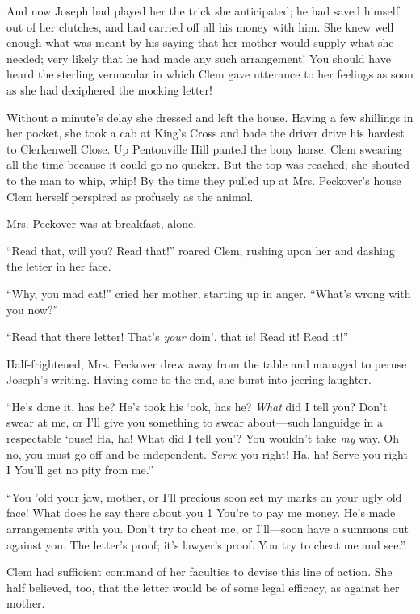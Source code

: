 And now Joseph had played her the trick she anticipated; he had saved
himself out of her clutches, and had carried off all his money with him.
She knew well enough what was meant by his saying that her mother would
supply what she needed; very likely that he had made any such
arrangement! You should have heard the sterling vernacular in which Clem
gave utterance to her feelings as soon as she had deciphered the mocking
letter!

Without a minute's delay she dressed and left the house. Having a few
shillings in her pocket, she took a cab at King's Cross and bade the
driver drive his hardest to Clerkenwell Close. Up Pentonville Hill
panted the bony horse, Clem swearing all the time because it could go no
quicker. But the top was reached; she shouted to the man to whip, whip!
By the time they pulled up at Mrs. Peckover's house Clem herself
perspired as profusely as the animal.

Mrs. Peckover was at breakfast, alone.

``Read that, will you? Read that!'' roared {}Clem, rushing upon her and
dashing the letter in her face.

``Why, you mad cat!'' cried her mother, starting up in anger. ``What's
wrong with you now?''

``Read that there letter! That's \emph{your} doin', that is! Read it!
Read it!''

Half-frightened, Mrs. Peckover drew away from the table and managed to
peruse Joseph's writing. Having come to the end, she burst into jeering
laughter.

``He's done it, has he? He's took his `ook, has he? \emph{What} did I
tell you? Don't swear at me, or I'll give you something to swear
about---such languidge in a respectable `ouse! Ha, ha! What did I tell
you'? You wouldn't take \emph{my} way. Oh no, you must go off and be
independent. \emph{Serve} you right! Ha, ha! Serve you right I You'll
get no pity from me.''

``You 'old your jaw, mother, or I'll precious soon set my marks on your
ugly old face! What does he say there about you 1 You're to pay me
money. He's made arrangements with you. Don't try to cheat me, or
I'll---soon have a summons out against you. The {}letter's proof; it's
lawyer's proof. You try to cheat me and see.''

Clem had sufficient command of her faculties to devise this line of
action. She half believed, too, that the letter would be of some legal
efficacy, as against her mother.

